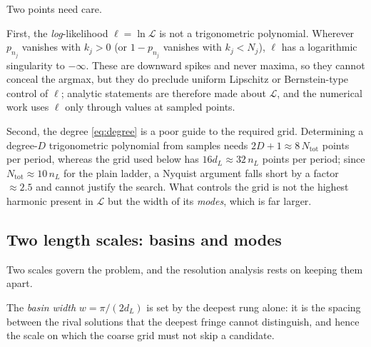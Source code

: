 \documentclass[%
 twocolumn,
 amsmath,amssymb,
prx,
longbibliography
]{revtex4-2}
\newcommand{\Ntot}{N_{\mathrm{tot}}}
\begin{document}
Two points need care.

First, the \emph{log}-likelihood $\ell = \ln \mathcal{L}$ is not a trigonometric polynomial. Wherever $p_{n_j}$ vanishes with $k_j > 0$ (or $1 - p_{n_j}$ vanishes with $k_j < N_j$), $\ell$ has a logarithmic singularity to $-\infty$. These are downward spikes and never maxima, so they cannot conceal the argmax, but they do preclude uniform Lipschitz or Bernstein-type control of $\ell$; analytic statements are therefore made about $\mathcal{L}$, and the numerical work uses $\ell$ only through values at sampled points.

Second, the degree \eqref{eq:degree} is a poor guide to the required grid. Determining a degree-$D$ trigonometric polynomial from samples needs $2D + 1 \approx 8\,\Ntot$ points per period, whereas the grid used below has $16 d_L \approx 32\, n_L$ points per period; since $\Ntot \approx 10\, n_L$ for the plain ladder, a Nyquist argument falls short by a factor $\approx 2.5$ and cannot justify the search. What controls the grid is not the highest harmonic present in $\mathcal{L}$ but the width of its \emph{modes}, which is far larger.

\subsection{Two length scales: basins and modes}\label{app:scales}

Two scales govern the problem, and the resolution analysis rests on keeping them apart.

The \emph{basin width} $w = \pi/(2 d_L)$ is set by the deepest rung alone: it is the spacing between the rival solutions that the deepest fringe cannot distinguish, and hence the scale on which the coarse grid must not skip a candidate.
\end{document}

